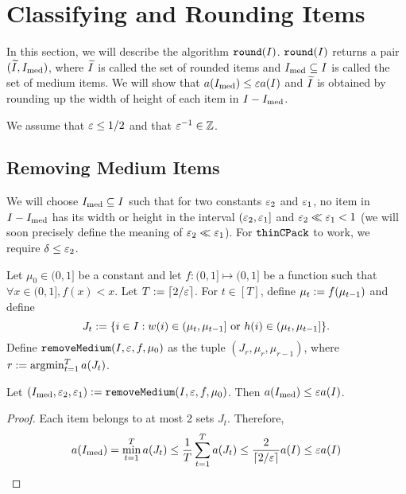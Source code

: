 \section{Classifying and Rounding Items}
\label{sec:thin-bp:round}

In this section, we will describe the algorithm $\operatorname{\mathtt{round}}(I)$.
$\operatorname{\mathtt{round}}(I)$ returns a pair $(\widetilde{I}, I_{\mathrm{med}})$, where $\widetilde{I}$
is called the set of rounded items and
$I_{\mathrm{med}} \subseteq I$ is called the set of medium items.
We will show that $a(I_{\mathrm{med}}) \le \varepsilon a(I)$ and
$\widetilde{I}$ is obtained by rounding up the width of height of each item in $I - I_{\mathrm{med}}$.

We assume that $\varepsilon \le 1/2$ and that $\varepsilon^{-1} \in \mathbb{Z}$.

\subsection{Removing Medium Items}
\label{sec:thin-bp:remmed}

We will choose $I_{\mathrm{med}} \subseteq I$ such that for two constants $\varepsilon_2$ and $\varepsilon_1$,
no item in $I - I_{\mathrm{med}}$ has its width or height in the interval $(\varepsilon_2, \varepsilon_1]$
and $\varepsilon_2 \ll \varepsilon_1 < 1$
(we will soon precisely define the meaning of $\varepsilon_2 \ll \varepsilon_1$).
For $\operatorname{\mathtt{thinCPack}}$ to work, we require $\delta \le \varepsilon_2$.

\begin{definition}
\label{defn:thin-bp:remmed}
Let $\mu_0 \in (0, 1]$ be a constant and let
$f: (0, 1] \mapsto (0, 1]$ be a function such that $\forall x \in (0, 1], f(x) < x$.
Let $T := \left\lceil 2/\varepsilon \right\rceil$.
For $t \in [T]$, define $\mu_t := f(\mu_{t-1})$ and define
\[ J_t := \{i \in I: w(i) \in (\mu_t, \mu_{t-1}]
    \textrm{ or } h(i) \in (\mu_t, \mu_{t-1}]\}. \]
Define $\operatorname{\mathtt{removeMedium}}(I, \varepsilon, f, \mu_0)$ as the tuple $(J_r, \mu_r, \mu_{r-1})$,
where $r := \operatorname*{argmin}_{t=1}^T a(J_t)$.
\end{definition}

\begin{lemma}
\label{thm:thin-bp:remmed-area}
Let $(I_{\mathrm{med}}, \varepsilon_2, \varepsilon_1) := \operatorname{\mathtt{removeMedium}}(I, \varepsilon, f, \mu_0)$.
Then $a(I_{\mathrm{med}}) \le \varepsilon a(I)$.
\end{lemma}
\begin{proof}
Each item belongs to at most 2 sets $J_t$. Therefore,
\[ a(I_{\mathrm{med}}) = \min_{t=1}^T a(J_t)
\le \frac{1}{T} \sum_{t=1}^T a(J_t)
\le \frac{2}{\left\lceil 2/\varepsilon \right\rceil} a(I)
\le \varepsilon a(I) \qedhere \]
\end{proof}

